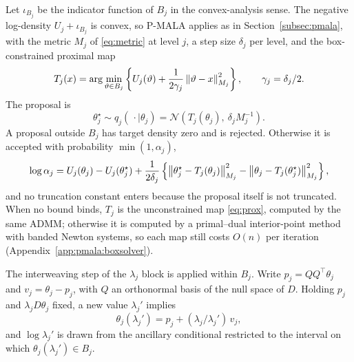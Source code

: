 Let $\iota_{B_j}$ be the indicator function of $B_j$ in the convex-analysis sense. The negative log-density $U_j + \iota_{B_j}$ is convex, so P-MALA applies as in Section~\ref{subsec:pmala}, with the metric $M_j$ of \eqref{eq:metric} at level $j$, a step size $\delta_j$ per level, and the box-constrained proximal map
\begin{equation}
    T_j(x) = \arg\min_{\vartheta\in B_j}
             \left\{U_j(\vartheta)+\frac{1}{2\gamma_j}\left\lVert\vartheta-x\right\rVert_{M_j}^2\right\},
             \qquad \gamma_j=\delta_j/2 .
    \label{eq:joint_prox}
\end{equation}
The proposal is
\begin{equation}
    \theta_j^\star \sim q_j(\,\cdot\mid\theta_j) = \mathcal N\!\left(T_j(\theta_j),\ \delta_jM_j^{-1}\right).
    \label{eq:joint_proposal}
\end{equation}
A proposal outside $B_j$ has target density zero and is rejected. Otherwise it is accepted with probability $\min(1,\alpha_j)$,
\begin{equation}
    \log\alpha_j = U_j(\theta_j)-U_j(\theta_j^\star)
    +\frac{1}{2\delta_j}\left\{\left\lVert\theta_j^\star-T_j(\theta_j)\right\rVert_{M_j}^2
            -\left\lVert\theta_j-T_j(\theta_j^\star)\right\rVert_{M_j}^2\right\},
    \label{eq:joint_accept}
\end{equation}
and no truncation constant enters because the proposal itself is not truncated. When no bound binds, $T_j$ is the unconstrained map \eqref{eq:prox}, computed by the same ADMM; otherwise it is computed by a primal--dual interior-point method with banded Newton systems, so each map still costs $O(n)$ per iteration (Appendix~\ref{app:pmala:boxsolver}).

The interweaving step of the $\lambda_j$ block is applied within $B_j$. Write $p_j=QQ^\top\theta_j$ and $v_j=\theta_j-p_j$, with $Q$ an orthonormal basis of the null space of $D$. Holding $p_j$ and $\lambda_jD\theta_j$ fixed, a new value $\lambda_j'$ implies
\begin{equation}
    \theta_j(\lambda_j')=p_j+(\lambda_j/\lambda_j')\,v_j ,
    \label{eq:joint_asis_curve}
\end{equation}
and $\log\lambda_j'$ is drawn from the ancillary conditional restricted to the interval on which $\theta_j(\lambda_j')\in B_j$.

